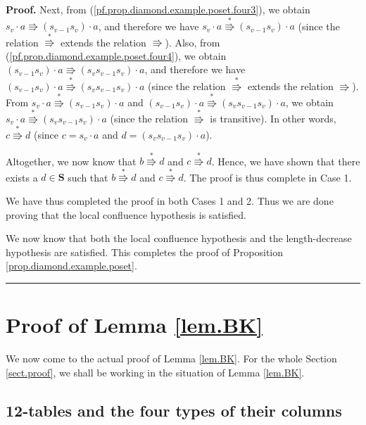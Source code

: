 \documentclass[numbers=enddot,12pt,final,onecolumn,notitlepage]{scrartcl}%
\theoremstyle{definition}
\newenvironment{proof}[1][Proof]{\noindent\textbf{#1.} }{\ \rule{0.5em}{0.5em}}
\newenvironment{verlong}{}{}
\begin{document}
\begin{proof}
\begin{verlong}
Next, from (\ref{pf.prop.diamond.example.poset.four3}), we obtain $s_{v}\cdot
a\Rrightarrow\left(  s_{v-1}s_{v}\right)  \cdot a$, and therefore we have
$s_{v}\cdot a\overset{\ast}{\Rrightarrow}\left(  s_{v-1}s_{v}\right)  \cdot a$
(since the relation $\overset{\ast}{\Rrightarrow}$ extends the relation
$\Rrightarrow$). Also, from (\ref{pf.prop.diamond.example.poset.four4}), we
obtain $\left(  s_{v-1}s_{v}\right)  \cdot a\Rrightarrow\left(  s_{v}%
s_{v-1}s_{v}\right)  \cdot a$, and therefore we have $\left(  s_{v-1}%
s_{v}\right)  \cdot a\overset{\ast}{\Rrightarrow}\left(  s_{v}s_{v-1}%
s_{v}\right)  \cdot a$ (since the relation $\overset{\ast}{\Rrightarrow}$
extends the relation $\Rrightarrow$). From $s_{v}\cdot a\overset{\ast
}{\Rrightarrow}\left(  s_{v-1}s_{v}\right)  \cdot a$ and $\left(  s_{v-1}%
s_{v}\right)  \cdot a\overset{\ast}{\Rrightarrow}\left(  s_{v}s_{v-1}%
s_{v}\right)  \cdot a$, we obtain $s_{v}\cdot a\overset{\ast}{\Rrightarrow
}\left(  s_{v}s_{v-1}s_{v}\right)  \cdot a$ (since the relation $\overset{\ast
}{\Rrightarrow}$ is transitive). In other words, $c\overset{\ast
}{\Rrightarrow}d$ (since $c=s_{v}\cdot a$ and $d=\left(  s_{v}s_{v-1}%
s_{v}\right)  \cdot a$).

Altogether, we now know that $b\overset{\ast}{\Rrightarrow}d$ and
$c\overset{\ast}{\Rrightarrow}d$. Hence, we have shown that there exists a
$d\in\mathbf{S}$ such that $b\overset{\ast}{\Rrightarrow}d$ and
$c\overset{\ast}{\Rrightarrow}d$. The proof is thus complete in Case 1.

We have thus completed the proof in both Cases 1 and 2. Thus we are done
proving that the local confluence hypothesis is satisfied.
\end{verlong}

We now know that both the local confluence hypothesis and the length-decrease
hypothesis are satisfied. This completes the proof of Proposition
\ref{prop.diamond.example.poset}.
\end{proof}

\section{\label{sect.proof}Proof of Lemma \ref{lem.BK}}

We now come to the actual proof of Lemma \ref{lem.BK}. For the whole Section
\ref{sect.proof}, we shall be working in the situation of Lemma \ref{lem.BK}.

\subsection{\label{subsect.fourtypes}12-tables and the four types of their
columns}
\end{document}
